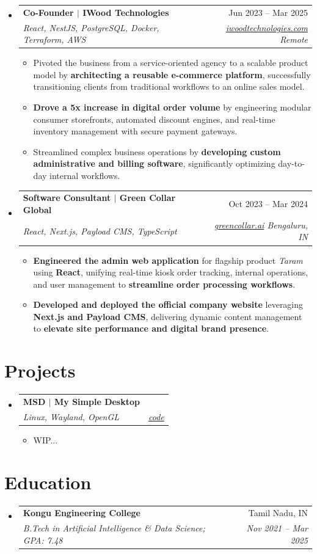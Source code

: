 \documentclass[11pt]{article}
\makeatletter
\newcommand{\resumeSubheading}[4]{
  \vspace{-1pt}
\item
  \begin{tabular*}{0.98\textwidth}{@{}l@{\extracolsep{\fill}}r@{}}
    \textbf{#1} & #2 \\[1pt]
    \textit{\small#3} & \textit{\small #4} \\
  \end{tabular*}\vspace{-2pt}
}
\makeatother
\begin{document}
\begin{itemize}
    \resumeSubheading
    {Co-Founder $|$ IWood Technologies}{Jun 2023 -- Mar 2025}
    {React, NestJS, PostgreSQL, Docker, Terraform, AWS}
    {\href{https://iwoodtechnologies.com}{\textnormal{\faExternalLink}iwoodtechnologies.com}
    \textbar{} Remote}
    \begin{itemize}
      \item Pivoted the business from a service-oriented agency to a
        scalable product model by \textbf{architecting a reusable
        e-commerce platform}, successfully transitioning clients from
        traditional workflows to an online sales model.
      \item \textbf{Drove a 5x increase in digital order volume} by
        engineering modular consumer storefronts, automated discount
        engines, and real-time inventory management with secure
        payment gateways.
      \item Streamlined complex business operations by
        \textbf{developing custom administrative and billing
        software}, significantly optimizing day-to-day internal workflows.
    \end{itemize}

    \resumeSubheading
    {Software Consultant $|$ Green Collar Global}{Oct 2023 -- Mar 2024}
    {React, Next.js, Payload CMS, TypeScript}
    {\href{https://greencollar.ai}{\textnormal{\faExternalLink}greencollar.ai}
    \textbar{} Bengaluru, IN}
    \begin{itemize}
      \item \textbf{Engineered the admin web application} for
        flagship product \textit{Taram} using \textbf{React},
        unifying real-time kiosk order tracking, internal operations,
        and user management to \textbf{streamline order processing workflows}.
      \item \textbf{Developed and deployed the official company
        website} leveraging \textbf{Next.js and Payload CMS},
        delivering dynamic content management to \textbf{elevate site
        performance and digital brand presence}.
    \end{itemize}

\end{itemize}

\section*{Projects}
\begin{itemize}

    \resumeSubheading
    {MSD $|$ My Simple Desktop}{}
    {Linux, Wayland, OpenGL}
    {\href{https://github.com/sujitbalasubramanian/MyDE}{\textnormal{\faExternalLink}code}}
    \begin{itemize}
      \item WIP...
    \end{itemize}

\end{itemize}

\section*{Education}
\begin{itemize}

    \resumeSubheading
    {Kongu Engineering College}{Tamil Nadu, IN}
    {B.Tech in Artificial Intelligence \& Data Science; GPA: 7.48}
    {Nov 2021 -- Mar 2025}

\end{itemize}
\end{document}
